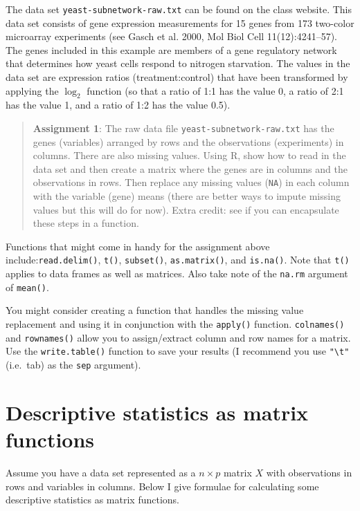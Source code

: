 The data set \lstinline!yeast-subnetwork-raw.txt! can be found on the
class website. This data set consists of gene expression measurements
for 15 genes from 173 two-color microarray experiments (see Gasch et al.
2000, Mol Biol Cell 11(12):4241--57). The genes included in this example
are members of a gene regulatory network that determines how yeast cells
respond to nitrogen starvation. The values in the data set are
expression ratios (treatment:control) that have been transformed by
applying the $\log_2$ function (so that a ratio of 1:1 has the value 0,
a ratio of 2:1 has the value 1, and a ratio of 1:2 has the value 0.5).

\begin{quote}
\textbf{Assignment 1}: The raw data file
\lstinline!yeast-subnetwork-raw.txt! has the genes (variables) arranged
by rows and the observations (experiments) in columns. There are also
missing values. Using R, show how to read in the data set and then
create a matrix where the genes are in columns and the observations in
rows. Then replace any missing values (\lstinline!NA!) in each column
with the variable (gene) means (there are better ways to impute missing
values but this will do for now). Extra credit: see if you can
encapsulate these steps in a function.

\end{quote}

Functions that might come in handy for the assignment above
include:\lstinline!read.delim()!, \lstinline!t()!, \lstinline!subset()!,
\lstinline!as.matrix()!, and \lstinline!is.na()!. Note that
\lstinline!t()! applies to data frames as well as matrices. Also take
note of the \lstinline!na.rm! argument of \lstinline!mean()!.

You might consider creating a function that handles the missing value
replacement and using it in conjunction with the \lstinline!apply()!
function. \lstinline!colnames()! and \lstinline!rownames()! allow you to
assign/extract column and row names for a matrix. Use the
\lstinline!write.table()! function to save your results (I recommend you
use \lstinline!"\t"! (i.e.~tab) as the \lstinline!sep! argument).

\section{Descriptive statistics as matrix functions}

Assume you have a data set represented as a $n \times p$ matrix $X$ with
observations in rows and variables in columns. Below I give formulae for
calculating some descriptive statistics as matrix functions.

